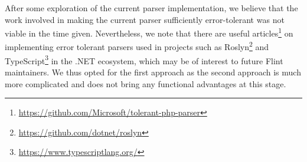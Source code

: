 After some exploration of the current parser implementation, we believe that the work involved in making the current parser sufficiently error-tolerant was not viable in the time given. Nevertheless, we note that there are useful articles\footnote{\url{https://github.com/Microsoft/tolerant-php-parser}} on implementing error tolerant parsers used in projects such as Roslyn\footnote{\url{https://github.com/dotnet/roslyn}} and TypeScript\footnote{\url{https://www.typescriptlang.org/}} in the .NET ecosystem, which may be of interest to future Flint maintainers. We thus opted for the first approach as the second approach is much more complicated and does not bring any functional advantages at this stage.
